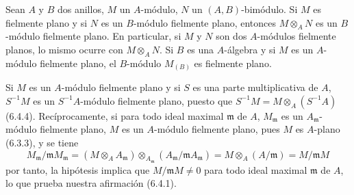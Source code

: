 \begin{env}[6.4.4]
\label{0.6.4.4-fr}
Sean $A$ y $B$ dos anillos, $M$ un $A$-módulo, $N$ un
$(A,B)$-bimódulo. Si $M$ es fielmente plano y si $N$ es un $B$-módulo
fielmente plano, entonces $M\otimes_A N$ es un $B$-módulo fielmente plano. En
particular, si $M$ y $N$ son dos $A$-módulos fielmente planos, lo mismo
ocurre con $M\otimes_A N$. Si $B$ es una $A$-álgebra y si $M$ es un
$A$-módulo fielmente plano, el $B$-módulo $M_{(B)}$ es fielmente plano.
\end{env}

\begin{env}[6.4.5]
\label{0.6.4.5-fr}
Si $M$ es un $A$-módulo fielmente plano y si $S$ es una parte
multiplicativa de $A$, $S^{-1}M$ es un $S^{-1}A$-módulo fielmente plano,
puesto que $S^{-1}M=M\otimes_A(S^{-1}A)$ (6.4.4). Recíprocamente, si para todo
ideal maximal $\mathfrak{m}$ de $A$, $M_\mathfrak{m}$ es un
$A_\mathfrak{m}$-módulo fielmente plano, $M$ es un $A$-módulo fielmente
plano, pues $M$ es $A$-plano (6.3.3), y se tiene
\[
  M_\mathfrak{m}/\mathfrak{m}M_\mathfrak{m}
  =(M\otimes_A A_\mathfrak{m})
  \otimes_{A_\mathfrak{m}}
  (A_\mathfrak{m}/\mathfrak{m}A_\mathfrak{m})
  =M\otimes_A(A/\mathfrak{m})
  =M/\mathfrak{m}M
\]
por tanto, la hipótesis implica que $M/\mathfrak{m}M\neq0$ para todo ideal
maximal $\mathfrak{m}$ de $A$, lo que prueba nuestra afirmación (6.4.1).
\end{env}

